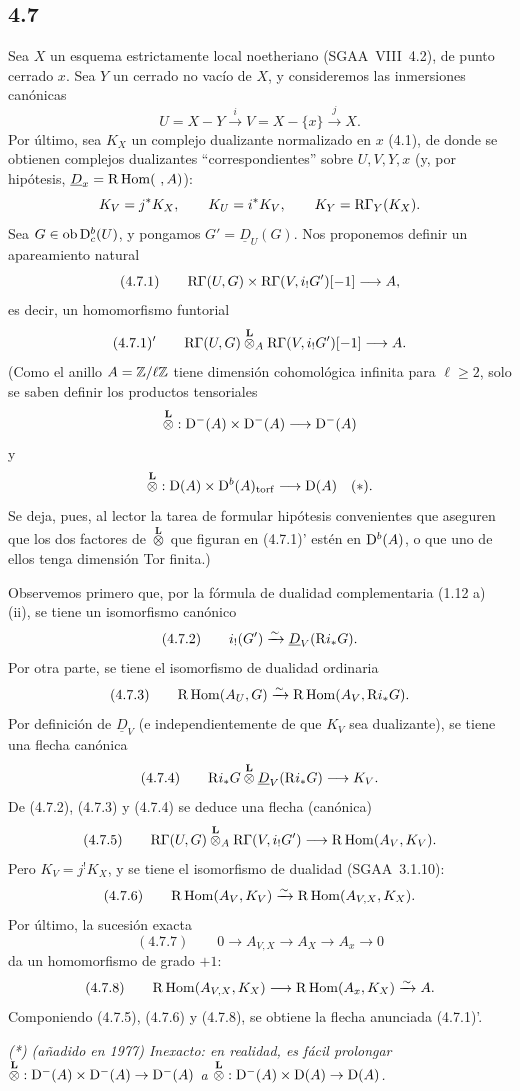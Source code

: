 \subsection*{4.7}
Sea $X$ un esquema estrictamente local noetheriano (SGAA~VIII~4.2), de punto cerrado $x$. Sea $Y$ un cerrado no vacío de $X$, y consideremos las inmersiones canónicas
\[
U=X-Y\xrightarrow{i}V=X-\{x\}\xrightarrow{j}X.
\]
Por último, sea $K_X$ un complejo dualizante normalizado en $x$ (4.1), de donde se obtienen complejos dualizantes \textquotedblleft correspondientes\textquotedblright{} sobre $U,V,Y,x$ (y, por hipótesis, $\underline{D}_x=\R\Hom(\ ,A)$):
\[
K_V=j^*K_X,
\qquad K_U=i^*K_V,
\qquad K_Y=\mathrm{R}\Gamma_Y(K_X).
\]
Sea $G\in\operatorname{ob}\mathrm{D}_c^b(U)$, y pongamos $G'=\underline{D}_U(G)$. Nos proponemos definir un apareamiento natural
\[
(4.7.1)\qquad \mathrm{R}\Gamma(U,G)\times \mathrm{R}\Gamma(V,i_!G')[-1]\longrightarrow A,
\]
es decir, un homomorfismo funtorial
\[
(4.7.1)'\qquad \mathrm{R}\Gamma(U,G)\overset{\mathbf L}{\otimes}_A\mathrm{R}\Gamma(V,i_!G')[-1]\longrightarrow A.
\]
(Como el anillo $A=\mathbb{Z}/\ell\mathbb{Z}$ tiene dimensión cohomológica infinita para $\ell\geqslant2$, solo se saben definir los productos tensoriales
\[
\overset{\mathbf L}{\otimes}:\mathrm{D}^-(A)\times\mathrm{D}^-(A)\longrightarrow\mathrm{D}^-(A)
\]
y
\[
\overset{\mathbf L}{\otimes}:\mathrm{D}(A)\times\mathrm{D}^b(A)_{\mathrm{torf}}\longrightarrow\mathrm{D}(A)\quad(*).
\]
Se deja, pues, al lector la tarea de formular hipótesis convenientes que aseguren que los dos factores de $\overset{\mathbf L}{\otimes}$ que figuran en (4.7.1)' estén en $\mathrm{D}^b(A)$, o que uno de ellos tenga dimensión Tor finita.)

Observemos primero que, por la fórmula de dualidad complementaria (1.12 a) (ii), se tiene un isomorfismo canónico
\[
(4.7.2)\qquad i_!(G')\xrightarrow{\sim}\underline{D}_V(\mathrm{R} i_*G).
\]
Por otra parte, se tiene el isomorfismo de dualidad ordinaria
\[
(4.7.3)\qquad \mathrm{R}\operatorname{Hom}(A_U,G)\xrightarrow{\sim}\mathrm{R}\operatorname{Hom}(A_V,\mathrm{R} i_*G).
\]
Por definición de $\underline{D}_V$ (e independientemente de que $K_V$ sea dualizante), se tiene una flecha canónica
\[
(4.7.4)\qquad \mathrm{R} i_*G\overset{\mathbf L}{\otimes}\underline{D}_V(\mathrm{R} i_*G)\longrightarrow K_V.
\]
De (4.7.2), (4.7.3) y (4.7.4) se deduce una flecha (canónica)
\[
(4.7.5)\qquad \mathrm{R}\Gamma(U,G)\overset{\mathbf L}{\otimes}_A\mathrm{R}\Gamma(V,i_!G')\longrightarrow \mathrm{R}\operatorname{Hom}(A_V,K_V).
\]
Pero $K_V=j^{!}K_X$, y se tiene el isomorfismo de dualidad (SGAA~3.1.10):
\[
(4.7.6)\qquad \mathrm{R}\operatorname{Hom}(A_V,K_V)\xrightarrow{\sim}\mathrm{R}\operatorname{Hom}(A_{V,X},K_X).
\]
Por último, la sucesión exacta
\[
(4.7.7)\qquad 0\longrightarrow A_{V,X}\longrightarrow A_X\longrightarrow A_x\longrightarrow 0
\]
da un homomorfismo de grado $+1$:
\[
(4.7.8)\qquad \mathrm{R}\operatorname{Hom}(A_{V,X},K_X)\longrightarrow \mathrm{R}\operatorname{Hom}(A_x,K_X)\xrightarrow{\sim}A.
\]
Componiendo (4.7.5), (4.7.6) y (4.7.8), se obtiene la flecha anunciada (4.7.1)'.

\emph{(*) (añadido en 1977) Inexacto: en realidad, es fácil prolongar $\overset{\mathbf L}{\otimes}:\mathrm{D}^-(A)\times\mathrm{D}^-(A)\to\mathrm{D}^-(A)$ a $\overset{\mathbf L}{\otimes}:\mathrm{D}^-(A)\times\mathrm{D}(A)\to\mathrm{D}(A)$.}
